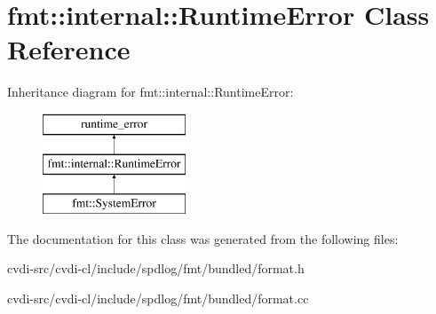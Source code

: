 \hypertarget{classfmt_1_1internal_1_1RuntimeError}{}\section{fmt\+:\+:internal\+:\+:Runtime\+Error Class Reference}
\label{classfmt_1_1internal_1_1RuntimeError}
Inheritance diagram for fmt\+:\+:internal\+:\+:Runtime\+Error\+:\begin{figure}[H]
\begin{center}
\leavevmode
\includegraphics[height=3.000000cm]{classfmt_1_1internal_1_1RuntimeError}
\end{center}
\end{figure}


The documentation for this class was generated from the following files\+:\begin{DoxyCompactItemize}
\item 
cvdi-\/src/cvdi-\/cl/include/spdlog/fmt/bundled/format.\+h\item 
cvdi-\/src/cvdi-\/cl/include/spdlog/fmt/bundled/format.\+cc\end{DoxyCompactItemize}
